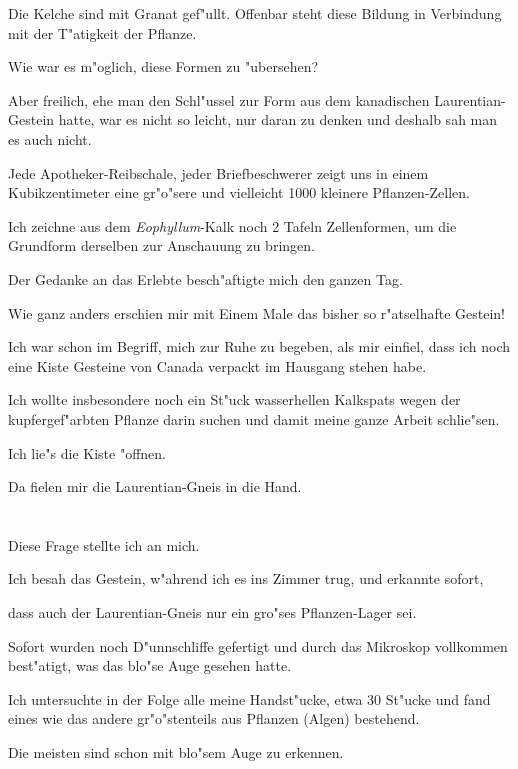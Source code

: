 \documentclass[a4paper, 11pt, oneside, german]{article}
\begin{document}
Die Kelche sind mit Granat gef"ullt. Offenbar steht diese Bildung in Verbindung mit der T"atigkeit der Pflanze.

Wie war es m"oglich, diese Formen zu "ubersehen?

Aber freilich, ehe man den Schl"ussel zur Form aus dem kanadischen Laurentian-Gestein hatte, war es nicht so leicht, nur daran zu denken und deshalb sah man es auch nicht.

Jede Apotheker-Reibschale, jeder Briefbeschwerer zeigt uns in einem Kubikzentimeter eine gr"o"sere und vielleicht 1000 kleinere Pflanzen-Zellen.

Ich zeichne aus dem \emph{Eophyllum}-Kalk noch 2 Tafeln Zellenformen, um die Grundform derselben zur Anschauung zu bringen.

Der Gedanke an das Erlebte besch"aftigte mich den ganzen Tag.

Wie ganz anders erschien mir mit Einem Male das bisher so r"atselhafte Gestein!

Ich war schon im Begriff, mich zur Ruhe zu begeben, als mir einfiel, dass ich noch eine Kiste Gesteine von Canada verpackt im Hausgang stehen habe.

Ich wollte insbesondere noch ein St"uck wasserhellen Kalkspats wegen der kupfergef"arbten Pflanze darin suchen und damit meine ganze Arbeit schlie"sen.

Ich lie"s die Kiste "offnen.

Da fielen mir die Laurentian-Gneis in die Hand.
\clearpage
\section{}
\paragraph{}
Diese Frage stellte ich an mich.

Ich besah das Gestein, w"ahrend ich es ins Zimmer trug, und erkannte sofort,

dass auch der Laurentian-Gneis nur ein gro"ses Pflanzen-Lager sei.

Sofort wurden noch D"unnschliffe gefertigt und durch das Mikroskop vollkommen best"atigt, was das blo"se Auge gesehen hatte.

Ich untersuchte in der Folge alle meine Handst"ucke, etwa 30 St"ucke und fand eines wie das andere gr"o"stenteils aus Pflanzen (Algen) bestehend.

Die meisten sind schon mit blo"sem Auge zu erkennen.
\end{document}
